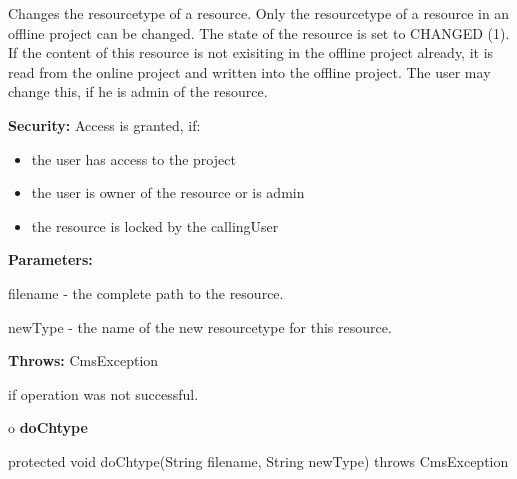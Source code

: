 \begin{description}
\htmlDD Changes the resourcetype of a resource. \htmlBR
Only the resourcetype of a resource in an offline project can be changed. The
state of the resource is set to CHANGED (1). If the content of this resource
is not exisiting in the offline project already, it is read from the online
project and written into the offline project. The user may change this, if he
is admin of the resource. 

{\bf Security:} Access is granted, if: 

\begin{itemize}
\item the user has access to the project 
\item the user is owner of the resource or is admin 
\item the resource is locked by the callingUser 
\end{itemize}

\begin{description}
\item {\bf Parameters:}  

filename - the complete path to the resource.  

newType - the name of the new resourcetype for this resource.  
\item {\bf Throws:} CmsException  

if operation was not successful.  
\end{description}

\end{description}

o {\bf doChtype} 

\begin{PRE}
 protected void doChtype(String filename,
                         String newType) throws CmsException
\end{PRE}

